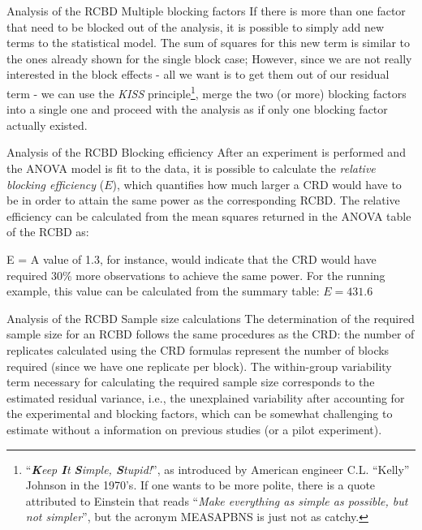 \documentclass[t]{beamer}
\begin{document}

\begin{ftst}
{Analysis of the RCBD}
{Multiple blocking factors}
If there is more than one factor that need to be blocked out of the analysis, it is possible to simply add new terms to the statistical model. The sum of squares for this new term is similar to the ones already shown for the single block case;
\vone
However, since we are not really interested in the block effects - all we want is to get them out of our residual term - we can use the \textit{KISS} principle\footnote[4]{\tiny``\textit{\textbf{K}eep \textbf{I}t \textbf{S}imple, \textbf{S}tupid!}'', as introduced by American engineer C.L. ``Kelly'' Johnson in the 1970's. If one wants to be more polite, there is a quote attributed to Einstein that reads ``\textit{Make everything as simple as possible, but not simpler}'', but the acronym MEASAPBNS is just not as catchy.}, merge the two (or more) blocking factors into a single one and proceed with the analysis as if only one blocking factor actually existed.
\end{ftst}


\begin{ftst}
{Analysis of the RCBD}
{Blocking efficiency}
After an experiment is performed and the ANOVA model is fit to the data, it is possible to calculate the \textit{relative blocking efficiency} ($E$), which quantifies how much larger a CRD would have to be in order to attain the same power as the corresponding RCBD.
\vone
The relative efficiency can be calculated from the mean squares returned in the ANOVA table of the RCBD as:

\beqs
E = 
\eqs
\vhalf
A value of 1.3, for instance, would indicate that the CRD would have required $30\%$ more observations to achieve the same power. For the running example, this value can be calculated from the summary table: $ E = 431.6$
\end{ftst}


\begin{ftst}
{Analysis of the RCBD}
{Sample size calculations}
The determination of the required sample size for an RCBD follows the same procedures as the CRD: the number of replicates calculated using the CRD formulas represent the number of blocks required (since we have one replicate per block).
\vone
The within-group variability term necessary for calculating the required sample size corresponds to the estimated residual variance, i.e., the unexplained variability after accounting for the experimental and blocking factors, which can be somewhat challenging to estimate without a information on previous studies (or a pilot experiment).
\end{ftst}
\end{document}
